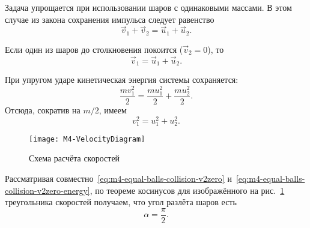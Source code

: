 \documentclass[a4paper, 12pt]{extarticle}
\begin{document}
Задача упрощается при использовании шаров с одинаковыми массами. В этом случае из закона сохранения импульса следует равенство
\begin{equation}
\label{eq:m4-equal-balls-collision}
\vec v_1 + \vec v_2 = \vec u_1 + \vec u_2.
\end{equation}

Если один из шаров до столкновения покоится ($\vec v_2 = 0$), то
\begin{equation}
\label{eq:m4-equal-balls-collision-v2zero}
\vec v_1 = \vec u_1 + \vec u_2.
\end{equation}



При упругом ударе кинетическая энергия системы сохраняется:
\[
\frac{m v_1^2}{2} = \frac{m u_1^2}{2} + \frac{m u_2^2}{2}.
\]
Отсюда, сократив на $m/2$, имеем
\begin{equation}
\label{eq:m4-equal-balls-collision-v2zero-energy}
v_1^2 = u_1^2 + u_2^2.
\end{equation}


\begin{figure}
\centering
\texttt{[image: M4-VelocityDiagram]}
\caption{Схема расчёта скоростей\label{fig:m4-velocity-triangle}} %
\end{figure}



Рассматривая совместно~\eqref{eq:m4-equal-balls-collision-v2zero} и~\eqref{eq:m4-equal-balls-collision-v2zero-energy}, по теореме косинусов для изображённого на рис.~\ref{fig:m4-velocity-triangle} треугольника скоростей получаем, что угол разлёта шаров есть %
\[
\alpha = \frac{\pi}{2}.
\]
\end{document}
